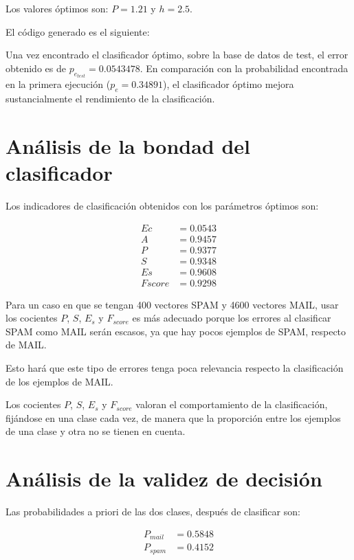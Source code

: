 \documentclass[11pt]{article} %
\begin{document}
Los valores óptimos son: $P=1.21$ y $h=2.5$.

El código generado es el siguiente:



Una vez encontrado el clasificador óptimo, sobre la base de datos de test, el error obtenido es de $p_{e_{test}} = 0.0543478$. En comparación con la probabilidad encontrada en la primera ejecución ($p_e = 0.34891$), el clasificador óptimo mejora sustancialmente el rendimiento de la clasificación.

\section{Análisis de la bondad del clasificador}

Los indicadores de clasificación obtenidos con los parámetros óptimos son:

\begin{align}
	Ec &= 0.0543 \\
	A &= 0.9457 \\
	P &= 0.9377 \\
	S &= 0.9348 \\
	Es &= 0.9608 \\
	Fscore &= 0.9298
\end{align}

Para un caso en que se tengan 400 vectores SPAM y 4600 vectores MAIL, usar los cocientes $P$, $S$, $E_s$ y $F_{score}$ es más adecuado porque los errores al clasificar SPAM como MAIL serán escasos, ya que hay pocos ejemplos de SPAM, respecto de MAIL.

Esto hará que este tipo de errores tenga poca relevancia respecto la clasificación de los ejemplos de MAIL.

Los cocientes $P$, $S$, $E_s$ y $F_{score}$ valoran el comportamiento de la clasificación, fijándose en una clase cada vez, de manera que la proporción entre los ejemplos de una clase y otra no se tienen en cuenta.

\section{Análisis de la validez de decisión}

Las probabilidades a priori de las dos clases, después de clasificar son:

\begin{align}
	P_{mail} &= 0.5848 \\
	P_{spam} &= 0.4152
\end{align}
\end{document}
